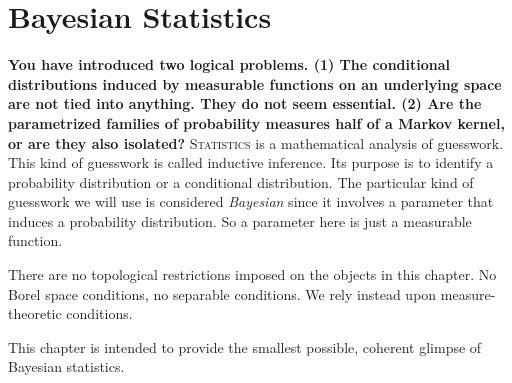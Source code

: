 \documentclass[
twoside=true,
paper=letter,
fontsize=9pt,
pagesize=auto,
leqno,
openany,
headsepline,
overfullrule,
]{scrbook}
\theoremstyle{plain}
\theoremstyle{plain}
\theoremstyle{definition}
\theoremstyle{bfnoteitalic}
\theoremstyle{bfnoteroman}
\begin{document}
\chapter{Bayesian Statistics}\label{bayesian_statistics}
\textbf{You have introduced two logical problems.
(1) The conditional distributions induced by measurable functions on an underlying space are not tied into anything. They do not seem essential.
(2) Are the parametrized families of probability measures half of a Markov kernel, or are they also isolated?}
\lettrine{S}{tatistics} is a mathematical analysis of guesswork. This kind of guesswork is called inductive inference.
Its purpose is to identify a probability distribution or a conditional distribution. The particular kind of guesswork we will use is considered \emph{Bayesian} since it involves a parameter that induces a  probability distribution. So a parameter here is just a measurable function.

There are no topological restrictions imposed on the objects in this chapter. No Borel space conditions, no separable conditions.  We rely instead upon measure-theoretic conditions.

This chapter is intended to provide the smallest possible, coherent glimpse of Bayesian statistics.
\end{document}
